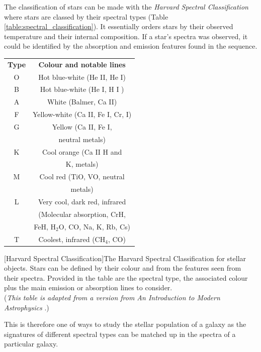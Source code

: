 \documentclass[12pt, twocolumn]{revtex4}    %
\begin{document}
The classification of stars can be made with the \textit{Harvard Spectral Classification} where stars are classed by their spectral types (Table \ref{table:spectral_classification}). It essentially orders stars by their observed temperature and their internal composition. If a star's spectra was observed, it could be identified by the absorption and emission features found in the sequence.    
\begin{center}
\begin{tabular}{c@{\hskip 20pt}c} 
 \hline
 \textbf{Type} & \textbf{Colour and notable lines} \\ [0.5ex] 
 O & Hot blue-white (He II, He I) \\
 B & Hot blue-white (He I, H I ) \\
 A & White (Balmer, Ca II) \\
 F & Yellow-white (Ca II, Fe I, Cr, I) \\
 G & Yellow (Ca II, Fe I,  \\
  & neutral metals) \\
 K & Cool orange (Ca II H and \\ 
  & K, metals) \\
 M & Cool red (TiO, VO, neutral \\
  & metals) \\
 L & Very cool, dark red, infrared \\
  & (Molecular absorption, CrH, \\
  & FeH, H$_2$O, CO, Na, K, Rb, Cs) \\
 T & Coolest, infrared (CH$_4$, CO) \\
 \hline
\end{tabular}
[Harvard Spectral Classification]{The Harvard Spectral Classification for stellar objects. Stars can be defined by their colour and from the features seen from their spectra. Provided in the table are the spectral type, the associated colour plus the main emission or absorption lines to consider. \\
(\textit{This table is adapted from a version from An Introduction to Modern Astrophysics} \cite{carroll_astro}.)}
\label{table:spectral_classification}
\end{center}


This is therefore one of ways to study the stellar population of a galaxy as the signatures of different spectral types can be matched up in the spectra of a particular galaxy. 
\end{document}
